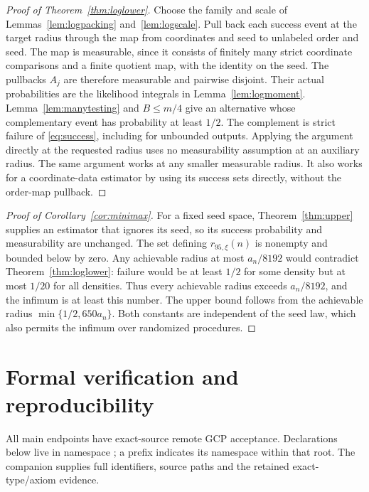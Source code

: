 \documentclass[11pt]{article}
\theoremstyle{remark}
\begin{document}
\begin{proof}[Proof of Theorem~\ref{thm:loglower}]
Choose the family and scale of Lemmas~\ref{lem:logpacking}
and~\ref{lem:logscale}. Pull back each success event at the target
radius through the map from coordinates and seed to unlabeled order
and seed. The map is measurable, since it consists of finitely many
strict coordinate comparisons and a finite quotient map, with the
identity on the seed. The pullbacks $A_j$ are therefore measurable
and pairwise disjoint. Their actual probabilities are the likelihood
integrals in Lemma~\ref{lem:logmoment}.
Lemma~\ref{lem:manytesting} and $B\le m/4$ give an alternative whose
complementary event has probability at least $1/2$.
The complement is strict failure of \eqref{eq:success}, including for
unbounded outputs. Applying the argument directly at the requested
radius uses no measurability assumption at an auxiliary radius.
The same argument works at any smaller measurable radius.
It also works for a coordinate-data estimator by using its success
sets directly, without the order-map pullback.
\end{proof}

\begin{proof}[Proof of Corollary~\ref{cor:minimax}]
For a fixed seed space, Theorem~\ref{thm:upper} supplies an estimator
that ignores its seed, so its success probability and measurability
are unchanged. The set defining $r_{95,\xi}(n)$ is nonempty and
bounded below by zero. Any achievable radius at most $a_n/8192$
would contradict Theorem~\ref{thm:loglower}: failure would be at least
$1/2$ for some density but at most $1/20$ for all densities.
Thus every achievable radius exceeds $a_n/8192$, and the infimum
is at least this number. The upper bound follows from the achievable
radius $\min\{1/2,650a_n\}$. Both constants are independent of the
seed law, which also permits the infimum over randomized procedures.
\end{proof}

\section{Formal verification and reproducibility}
\label{sec:formal}
All main endpoints have exact-source remote GCP acceptance.
Declarations below live in namespace ; a prefix
 indicates its namespace within that root.
The companion  supplies full identifiers, source
paths and the retained exact-type/axiom evidence.
\end{document}
